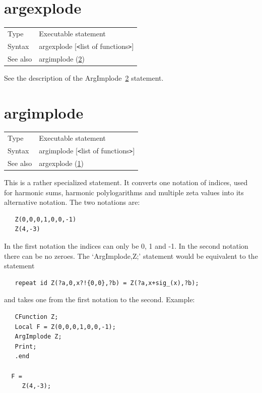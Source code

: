 
\section{argexplode}
\label{substaargexplode}

\noindent \begin{tabular}{ll}
Type & Executable statement\\
Syntax & argexplode [{\tt<}list of functions{\tt>}] \\
See also & argimplode (\ref{substaargimplode})
\end{tabular} \vspace{4mm}

\noindent See the description of the ArgImplode~\ref{substaargimplode} 
statement.
\vspace{10mm}


\section{argimplode}
\label{substaargimplode}

\noindent \begin{tabular}{ll}
Type & Executable statement\\
Syntax & argimplode [{\tt<}list of functions{\tt>}] \\
See also & argexplode (\ref{substaargexplode})
\end{tabular} \vspace{4mm}

\noindent This is a rather specialized statement. It converts one notation 
of indices, used for harmonic sums, harmonic 
polylogarithms and multiple zeta values into 
its alternative notation. The two notations are:
\begin{verbatim}
   Z(0,0,0,1,0,0,-1)
   Z(4,-3)
\end{verbatim}
In the first notation the indices can only be 0, 1 and -1. In the second 
notation there can be no zeroes. The `ArgImplode,Z;' 
statement would be 
equivalent to the statement
\begin{verbatim}
   repeat id Z(?a,0,x?!{0,0},?b) = Z(?a,x+sig_(x),?b);
\end{verbatim}
and takes one from the first notation to the second. Example:
\begin{verbatim}
   CFunction Z;
   Local F = Z(0,0,0,1,0,0,-1);
   ArgImplode Z;
   Print;
   .end

  F =
     Z(4,-3);
\end{verbatim}
\vspace{4mm}

